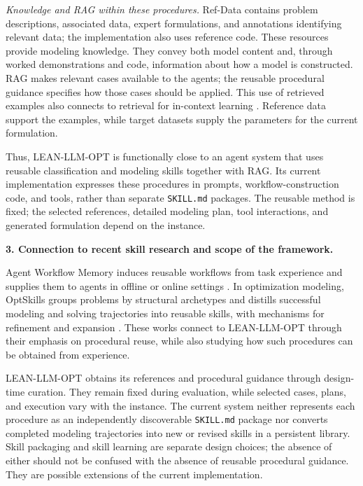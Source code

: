 {\emph{Knowledge and RAG within these procedures.}
Ref-Data contains problem descriptions, associated data, expert
formulations, and annotations identifying relevant data; the
implementation also uses reference code. These resources provide
modeling knowledge. They convey both model content and, through
worked demonstrations and code, information about how a model is
constructed. RAG makes relevant cases available to the agents;
the reusable procedural guidance specifies how those cases
should be applied. This use of retrieved examples also connects
to retrieval for in-context learning \citep{ae1_rubin2022epr}.
Reference data support the examples, while target datasets supply
the parameters for the current formulation.

Thus, LEAN-LLM-OPT is functionally close to an agent system that
uses reusable classification and modeling skills together with
RAG. Its current implementation expresses these procedures in
prompts, workflow-construction code, and tools, rather than
separate \texttt{SKILL.md} packages. The reusable method is fixed;
the selected references, detailed modeling plan, tool interactions,
and generated formulation depend on the instance.

\medskip
\noindent\textbf{3. Connection to recent skill research and scope of the framework.}

Agent Workflow Memory induces reusable workflows from task
experience and supplies them to agents in offline or online
settings \citep{ae1_wang2025awm}. In optimization modeling,
OptSkills groups problems by structural archetypes and distills
successful modeling and solving trajectories into reusable
skills, with mechanisms for refinement and expansion
\citep{ae1_yang2026optskills}. These works connect to LEAN-LLM-OPT
through their emphasis on procedural reuse, while also studying
how such procedures can be obtained from experience.

LEAN-LLM-OPT obtains its references and procedural guidance
through design-time curation. They remain fixed during evaluation,
while selected cases, plans, and execution vary with the instance.
The current system neither represents each procedure as an
independently discoverable \texttt{SKILL.md} package nor converts
completed modeling trajectories into new or revised skills in a
persistent library. Skill packaging and skill learning are separate
design choices; the absence of either should not be confused with
the absence of reusable procedural guidance. They are possible
extensions of the current implementation.

}
